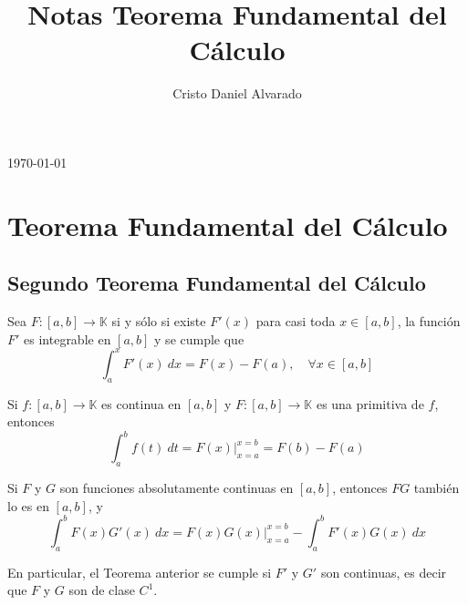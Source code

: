 \documentclass[12pt]{report}
\theoremstyle{largebreak}
\newcommand{\cf}[3]{\ensuremath{#1:#2\rightarrow#3}}
\begin{document}
	\title{Notas Teorema Fundamental del Cálculo}
	\author{Cristo Daniel Alvarado}
	\today
	\maketitle
	\tableofcontents %
	\setcounter{chapter}{0} %
	\chapter{Teorema Fundamental del Cálculo}
	\section{Segundo Teorema Fundamental del Cálculo}

	\begin{theor}
		Sea $\cf{F}{[a,b]}{\mathbb{K}}$ si y sólo si existe $F'(x)$ para casi toda $x\in [a,b]$, la función $F'$ es integrable en $[a,b]$ y se cumple que
		\begin{equation*}
			\int_{{a}}^{{x}} {F'(x)} \: d{x}={F(x)-F(a)},\quad \forall x\in [a,b]
		\end{equation*}
		
	\end{theor}

	\begin{cor}
		Si $\cf{f}{[a,b]}{\mathbb{K}}$ es continua en $[a,b]$ y $ \cf{F}{[a,b]}{\mathbb{K}}$ es una primitiva de $f$, entonces
		\begin{equation*}
			\int_{{a}}^{{b}} {f(t)} \: d{t}={F(x)\big|_{x=a}^{x=b}}={F(b)-F(a)}
		\end{equation*}
		
	\end{cor}
	
	\begin{theor}
		Si $F$ y $G$ son funciones absolutamente continuas en $[a,b]$, entonces $FG$ también lo es en $[a,b]$, y
		\begin{equation*}
			\int_{{a}}^{{b}} {F(x)G'(x)} \: d{x} = {F(x)G(x)\big|_{x=a}^{x=b}-\int_{{a}}^{{b}} {F'(x)G(x)} \: d{x}}			
		\end{equation*}
		
	\end{theor}

	\begin{obs}
		En particular, el Teorema anterior se cumple si $F'$ y $G'$ son continuas, es decir que $F$ y $G$ son de clase $C^1$.
	\end{obs}
	
\end{document}
